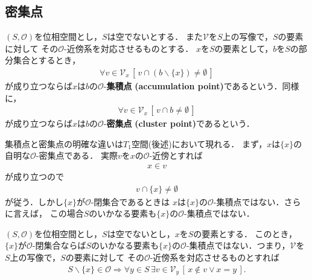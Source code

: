 \subsection{密集点}
	\begin{screen}
		\begin{dfn}
			$(S,\mathscr{O})$を位相空間とし，$S$は空でないとする．
			また$\mathcal{V}$を$S$上の写像で，$S$の要素に対して
			その$\mathscr{O}$-近傍系を対応させるものとする．
			$x$を$S$の要素として，$b$を$S$の部分集合とするとき，
			\begin{align}
				\forall v \in \mathcal{V}_{x}\, 
				\left[\, v \cap (b \backslash \{x\}) \neq \emptyset\, \right]
			\end{align}
			が成り立つならば$x$は$b$の$\mathscr{O}$-{\bf 集積点}
			{\bf (accumulation point)}であるという．同様に，
			\begin{align}
				\forall v \in \mathcal{V}_{x}\, \left[\, v \cap b \neq \emptyset\, \right]
			\end{align}
			が成り立つならば$x$は$b$の$\mathscr{O}$-{\bf 密集点}
			{\bf (cluster point)}であるという．
		\end{dfn}
	\end{screen}
	
	集積点と密集点の明確な違いは$T_1$空間(後述)において現れる．
	まず，$x$は$\{x\}$の自明な$\mathscr{O}$-密集点である．
	実際$v$を$x$の$\mathscr{O}$-近傍とすれば
	\begin{align}
		x \in v
	\end{align}
	が成り立つので
	\begin{align}
		v \cap \{x\} \neq \emptyset
	\end{align}
	が従う．しかし$\{x\}$が$\mathscr{O}$-閉集合であるときは
	$x$は$\{x\}$の$\mathscr{O}$-集積点ではない．さらに言えば，
	この場合$S$のいかなる要素も$\{x\}$の$\mathscr{O}$-集積点ではない．
	
	\begin{screen}
		\begin{thm}[閉である一点集合は集積点を持たない]
		\label{thm:closed_singleton_has_no_accumulation_point}
			$(S,\mathscr{O})$を位相空間とし，$S$は空でないとし，$x$を$S$の要素とする．
			このとき，$\{x\}$が$\mathscr{O}$-閉集合ならば$S$のいかなる要素も$\{x\}$の$\mathscr{O}$-集積点ではない．つまり，$\mathcal{V}$を$S$上の写像で，$S$の要素に対して
			その$\mathscr{O}$-近傍系を対応させるものとすれば
			\begin{align}
				S \backslash \{x\} \in \mathscr{O} \Longrightarrow
				\forall y \in S\, \exists v \in \mathcal{V}_{y}\, 
				\left[\, x \notin v \vee x = y\, \right].
			\end{align}
		\end{thm}
	\end{screen}
	
